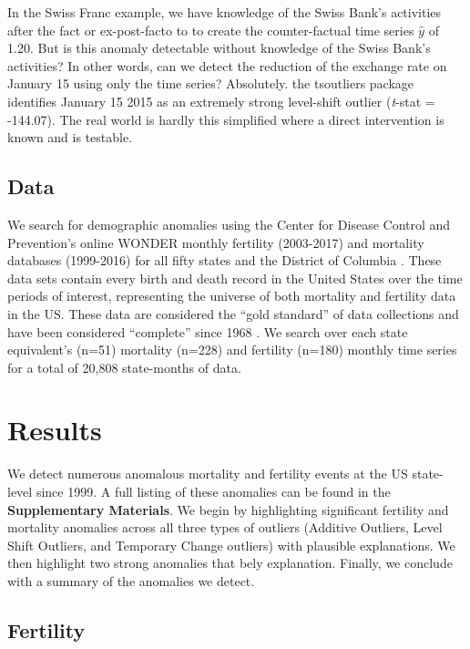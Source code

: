 \documentclass[12pt]{article}
\begin{document}
In the Swiss Franc example, we have knowledge of the Swiss Bank's
activities after the fact or ex-post-facto to to create the
counter-factual time series \(\hat{y}\) of 1.20. But is this anomaly
detectable without knowledge of the Swiss Bank's activities? In other
words, can we detect the reduction of the exchange rate on January 15
using only the time series? Absolutely. the tsoutliers package
identifies January 15 2015 as an extremely strong level-shift outlier
(\emph{t}-stat = -144.07). The real world is hardly this simplified
where a direct intervention is known and is testable.

\hypertarget{data}{%
\subsection{Data}\label{data}}

We search for demographic anomalies using the Center for Disease Control
and Prevention's online WONDER monthly fertility (2003-2017) and
mortality databases (1999-2016) for all fifty states and the District of
Columbia \citep{CDC_fert07, CDC_mort}. These data sets contain every
birth and death record in the United States over the time periods of
interest, representing the universe of both mortality and fertility data
in the US. These data are considered the ``gold standard'' of data
collections \citep{mahapatra2007civil} and have been considered
``complete'' since 1968 \citep{hetzel2016us}. We search over each state
equivalent's (n=51) mortality (n=228) and fertility (n=180) monthly time
series for a total of 20,808 state-months of data.

\hypertarget{results}{%
\section{Results}\label{results}}

We detect numerous anomalous mortality and fertility events at the US
state-level since 1999. A full listing of these anomalies can be found
in the \textbf{Supplementary Materials}. We begin by highlighting
significant fertility and mortality anomalies across all three types of
outliers (Additive Outliers, Level Shift Outliers, and Temporary Change
outliers) with plausible explanations. We then highlight two strong
anomalies that bely explanation. Finally, we conclude with a summary of
the anomalies we detect.

\hypertarget{fertility}{%
\subsection{Fertility}\label{fertility}}
\end{document}

